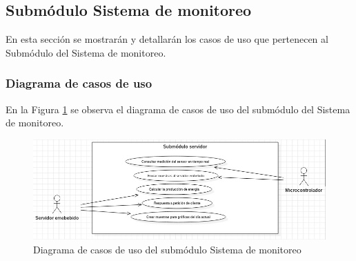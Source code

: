\subsection{Submódulo Sistema de monitoreo}
En esta sección se mostrarán y detallarán los casos de uso que pertenecen al Submódulo del Sistema de monitoreo.
\subsubsection{Diagrama de casos de uso}
En la Figura \ref{fig:dcu-moduloMonitoreo} se observa el diagrama de casos de uso del submódulo del Sistema de monitoreo.
\begin{figure}[H]
	\centering
	\includegraphics[scale=.6]{Capitulo4/software/submodulos/images/dcuservidor.jpg}
	\caption{Diagrama de casos de uso del submódulo Sistema de monitoreo}
	\label{fig:dcu-moduloMonitoreo}
\end{figure}





